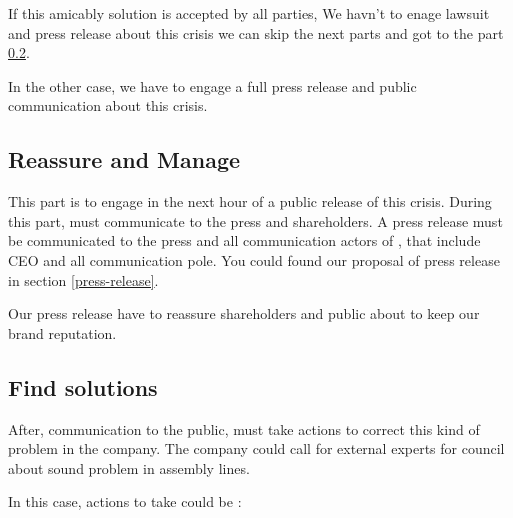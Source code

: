 If this amicably solution is accepted by all parties,  We havn't to enage lawsuit and press release about this crisis we can skip the next parts and got to the part \ref{endpart}.

In the other case, we have to engage a full press release and public communication about this crisis.

\subsection{Reassure and Manage}

This part is to engage in the next hour of a public release of this crisis.
During this part, \moldco must communicate to the press and shareholders.
A press release must be communicated to the press and all communication actors of \moldco, that include \moldco CEO and all communication pole.
You could found our proposal of press release in section \ref{press-release}.

Our press release have to reassure shareholders and public about \moldco to keep our brand reputation.

\subsection{Find solutions}
\label{endpart}

After, communication to the public, \moldco must take actions to correct this kind of problem in the company.
The company could call for external experts for council about sound problem in assembly lines.

In this case, actions to take could be :

